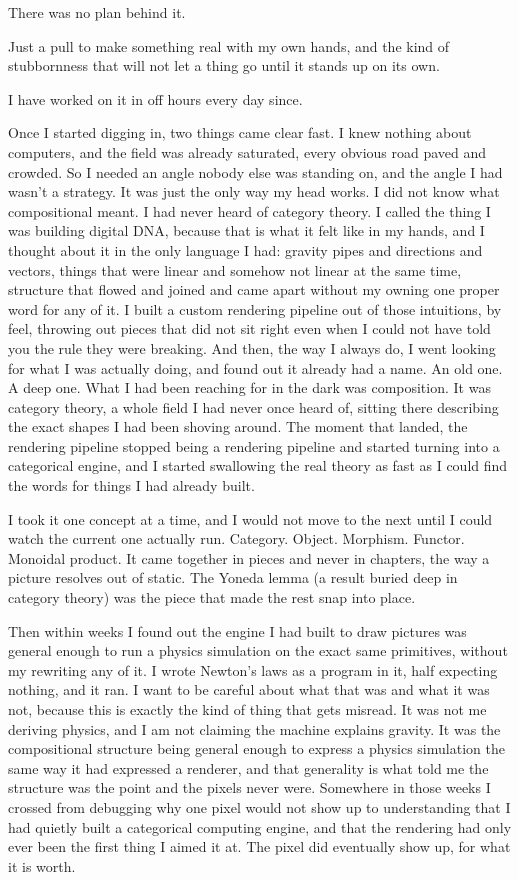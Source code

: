 \documentclass[11pt,twoside]{article}
\theoremstyle{thielethm}
\theoremstyle{thieledef}
\theoremstyle{thieledef}
\theoremstyle{thieledef}
\theoremstyle{thielethm}
\theoremstyle{thieleobs}
\theoremstyle{thielethm}
\begin{document}
There was no plan behind it.

Just a pull to make something real with my own hands, and the kind of stubbornness that will not let a thing go until it stands up on its own.

I have worked on it in off hours every day since.

Once I started digging in, two things came clear fast. I knew nothing about computers, and the field was already saturated, every obvious road paved and crowded. So I needed an angle nobody else was standing on, and the angle I had wasn't a strategy. It was just the only way my head works. I did not know what compositional meant. I had never heard of category theory. I called the thing I was building digital DNA, because that is what it felt like in my hands, and I thought about it in the only language I had: gravity pipes and directions and vectors, things that were linear and somehow not linear at the same time, structure that flowed and joined and came apart without my owning one proper word for any of it. I built a custom rendering pipeline out of those intuitions, by feel, throwing out pieces that did not sit right even when I could not have told you the rule they were breaking. And then, the way I always do, I went looking for what I was actually doing, and found out it already had a name. An old one. A deep one. What I had been reaching for in the dark was composition. It was category theory, a whole field I had never once heard of, sitting there describing the exact shapes I had been shoving around. The moment that landed, the rendering pipeline stopped being a rendering pipeline and started turning into a categorical engine, and I started swallowing the real theory as fast as I could find the words for things I had already built.

I took it one concept at a time, and I would not move to the next until I could watch the current one actually run. Category. Object. Morphism. Functor. Monoidal product. It came together in pieces and never in chapters, the way a picture resolves out of static. The Yoneda lemma (a result buried deep in category theory) was the piece that made the rest snap into place.

Then within weeks I found out the engine I had built to draw pictures was general enough to run a physics simulation on the exact same primitives, without my rewriting any of it. I wrote Newton's laws as a program in it, half expecting nothing, and it ran. I want to be careful about what that was and what it was not, because this is exactly the kind of thing that gets misread. It was not me deriving physics, and I am not claiming the machine explains gravity. It was the compositional structure being general enough to express a physics simulation the same way it had expressed a renderer, and that generality is what told me the structure was the point and the pixels never were. Somewhere in those weeks I crossed from debugging why one pixel would not show up to understanding that I had quietly built a categorical computing engine, and that the rendering had only ever been the first thing I aimed it at. The pixel did eventually show up, for what it is worth.
\end{document}

